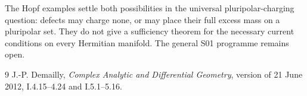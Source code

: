 \documentclass[11pt]{article}
\begin{document}
The Hopf examples settle both possibilities in the universal
pluripolar-charging question: defects may charge none, or may place
their full excess mass on a pluripolar set. They do not give a
sufficiency theorem for the necessary current conditions on every
Hermitian manifold. The general S01 programme remains open.
\begin{thebibliography}{9}
J.-P. Demailly, \emph{Complex Analytic and Differential Geometry},
version of 21 June 2012, I.4.15--4.24 and I.5.1--5.16.
\end{thebibliography}
\end{document}
